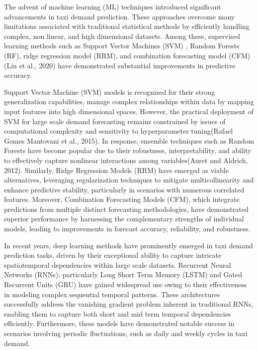 \documentclass{article}
\begin{document}
The advent of machine learning (ML) techniques introduced significant advancements in taxi demand prediction. These approaches overcome many limitations associated with traditional statistical methods by efficiently handling complex, non linear, and high dimensional datasets. Among these, supervised learning methods such as Support Vector Machines (SVM) \cite{jiang_2019_shortterm}, Random Forests (RF), ridge regression model (RRM), and combination forecasting model (CFM) (Liu et al., 2020) have demonstrated substantial improvements in predictive accuracy.

Support Vector Machine (SVM) models is recognized for their strong generalization capabilities, manage complex relationships within data by mapping input features into high dimensional spaces.\cite{ma_2018_using} However, the practical deployment of SVM for large scale demand forecasting remains constrained by issues of computational complexity and sensitivity to hyperparameter tuning(Rafael Gomes Mantovani et al., 2015). In response, ensemble techniques such as Random Forests have become popular due to their robustness, interpretability, and ability to effectively capture nonlinear interactions among variables(Auret and Aldrich, 2012). Similarly, Ridge Regression Models (RRM) have emerged as viable alternatives, leveraging regularization techniques to mitigate multicollinearity and enhance predictive stability, particularly in scenarios with numerous correlated features\cite{enwere_2023_comparative}. Moreover, Combination Forecasting Models (CFM), which integrate predictions from multiple distinct forecasting methodologies, have demonstrated superior performance by harnessing the complementary strengths of individual models, leading to improvements in forecast accuracy, reliability, and robustness.

In recent years, deep learning methods have prominently emerged in taxi demand prediction tasks, driven by their exceptional ability to capture intricate spatiotemporal dependencies within large scale datasets\cite{rodrigues_2019_combining}. Recurrent Neural Networks (RNNs), particularly Long Short Term Memory (LSTM) and Gated Recurrent Units (GRU) have gained widespread use owing to their effectiveness in modeling complex sequential temporal patterns\cite{arunkumar_2022_comparative}. These architectures successfully address the vanishing gradient problem inherent in traditional RNNs, enabling them to capture both short  and mid term temporal dependencies efficiently\cite{arunkumar_2022_comparative}. Furthermore, these models have demonstrated notable success in scenarios involving periodic fluctuations, such as daily and weekly cycles in taxi demand.
\end{document}

